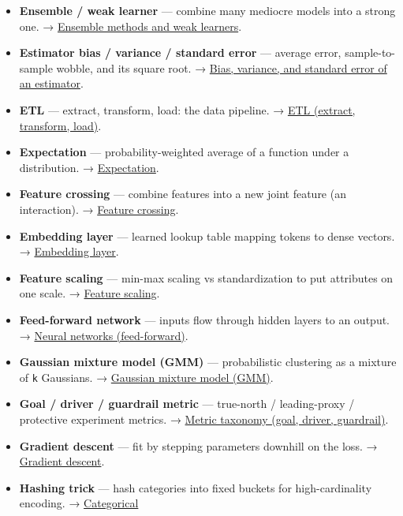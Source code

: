 \documentclass[
  10pt,
  letterpaper,
  onecolumn]{article}
\begin{document}
\begin{itemize}
{  decoder, and cross-attention}.
\item
  \textbf{Ensemble / weak learner} --- combine many mediocre models into
  a strong one. →
  \protect\hyperlink{ensemble-methods-and-weak-learners}{Ensemble
  methods and weak learners}.
\item
  \textbf{Estimator bias / variance / standard error} --- average error,
  sample-to-sample wobble, and its square root. →
  \protect\hyperlink{bias-variance-and-standard-error-of-an-estimator}{Bias,
  variance, and standard error of an estimator}.
\item
  \textbf{ETL} --- extract, transform, load: the data pipeline. →
  \protect\hyperlink{etl-extract-transform-load}{ETL (extract,
  transform, load)}.
\item
  \textbf{Expectation} --- probability-weighted average of a function
  under a distribution. →
  \protect\hyperlink{expectation}{Expectation}.
\item
  \textbf{Feature crossing} --- combine features into a new joint
  feature (an interaction). →
  \protect\hyperlink{feature-crossing}{Feature crossing}.
\item
  \textbf{Embedding layer} --- learned lookup table mapping tokens to
  dense vectors. → \protect\hyperlink{embedding-layer}{Embedding layer}.
\item
  \textbf{Feature scaling} --- min-max scaling vs standardization to put
  attributes on one scale. → \protect\hyperlink{feature-scaling}{Feature
  scaling}.
\item
  \textbf{Feed-forward network} --- inputs flow through hidden layers to
  an output. → \protect\hyperlink{neural-networks-feed-forward}{Neural
  networks (feed-forward)}.
\item
  \textbf{Gaussian mixture model (GMM)} --- probabilistic clustering as
  a mixture of \texttt{k} Gaussians. →
  \protect\hyperlink{gaussian-mixture-model-gmm}{Gaussian mixture model
  (GMM)}.
\item
  \textbf{Goal / driver / guardrail metric} --- true-north /
  leading-proxy / protective experiment metrics. →
  \protect\hyperlink{metric-taxonomy-goal-driver-guardrail}{Metric
  taxonomy (goal, driver, guardrail)}.
\item
  \textbf{Gradient descent} --- fit by stepping parameters downhill on
  the loss. → \protect\hyperlink{gradient-descent}{Gradient descent}.
\item
  \textbf{Hashing trick} --- hash categories into fixed buckets for
  high-cardinality encoding. →
  \protect\hyperlink{categorical-feature-encoding-hashing-trick}{Categorical
}
\end{itemize}
\end{document}
